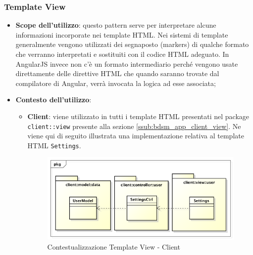 	\subsubsection{Template View} %
	\label{ssub:template_view}
		\begin{itemize}
			\item \textbf{Scope dell'utilizzo}: questo pattern serve per interpretare alcune informazioni incorporate nei template HTML. Nei sistemi di template generalmente vengono utilizzati dei segnaposto (markers) di qualche formato che verranno interpretati e sostituiti con il codice HTML adeguato. In AngularJS invece non c'è un formato intermediario perché vengono usate direttamente delle direttive HTML che quando saranno trovate dal compilatore di Angular, verrà invocata la logica ad esse associata;
			\item \textbf{Contesto dell'utilizzo}:
				\begin{itemize}
					\item \textbf{Client}: viene utilizzato in tutti i template HTML presentati nel package \texttt{client::view} presente alla sezione \ref{ssub:bdsm_app_client_view}. \newline
					Ne viene qui di seguito illustrata una implementazione relativa al template HTML \texttt{Settings}. \newline
					\begin{figure}[htbp]
						\centering
						\centerline{\includegraphics[scale=0.50]{./images/design_pattern_client/client_template_view.pdf}}
						\caption{Contestualizzazione Template View - Client}
					\end{figure}
				\end{itemize}
		\end{itemize}


